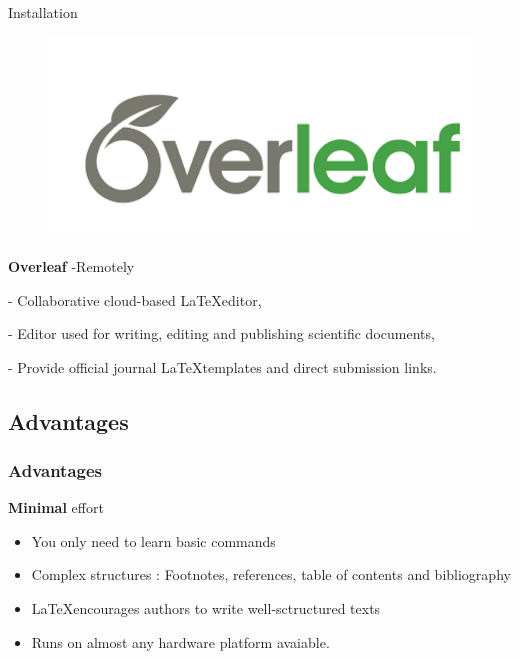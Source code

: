 \documentclass{beamer}
\begin{document}
\subsection*{}
\begin{frame}{Installation}


\begin{figure}
\includegraphics[width=0.9\linewidth]{figures/overleaf.png} 
\label{fig:wrapfig}
\end{figure}

\begin{block}{\textbf{Overleaf} -Remotely }
\end{block}

-  Collaborative cloud-based \LaTeX editor,

- Editor used for writing, editing and publishing scientific documents,

-  Provide official journal \LaTeX templates and direct submission links. 
    
\end{frame}



\subsection{Advantages}

\begin{frame}
	\frametitle<presentation>{Advantages}
\begin{block}{\textbf{Minimal} effort}
\begin{itemize}
    \item You only need to learn basic commands 
    \item Complex structures : Footnotes, references, table of contents and bibliography
    \item \LaTeX encourages authors to write well-sctructured texts
    \item Runs on almost any hardware platform avaiable.
\end{itemize}
\end{block}
\end{frame}
\end{document}
